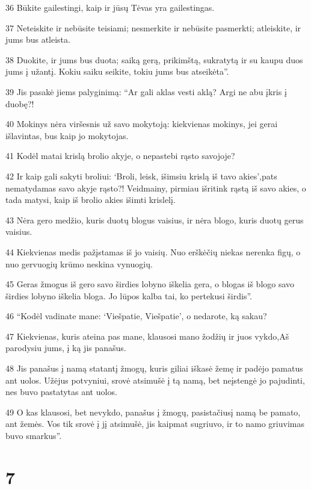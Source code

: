 \par 36 Būkite gailestingi, kaip ir jūsų Tėvas yra gailestingas. 
\par 37 Neteiskite ir nebūsite teisiami; nesmerkite ir nebūsite pasmerkti; atleiskite, ir jums bus atleista. 
\par 38 Duokite, ir jums bus duota; saiką gerą, prikimštą, sukratytą ir su kaupu duos jums į užantį. Kokiu saiku seikite, tokiu jums bus atseikėta”. 
\par 39 Jis pasakė jiems palyginimą: “Ar gali aklas vesti aklą? Argi ne abu įkris į duobę?! 
\par 40 Mokinys nėra viršesnis už savo mokytoją: kiekvienas mokinys, jei gerai išlavintas, bus kaip jo mokytojas. 
\par 41 Kodėl matai krislą brolio akyje, o nepastebi rąsto savojoje? 
\par 42 Ir kaip gali sakyti broliui: ‘Broli, leisk, išimsiu krislą iš tavo akies’,­pats nematydamas savo akyje rąsto?! Veidmainy, pirmiau išritink rąstą iš savo akies, o tada matysi, kaip iš brolio akies išimti krislelį. 
\par 43 Nėra gero medžio, kuris duotų blogus vaisius, ir nėra blogo, kuris duotų gerus vaisius. 
\par 44 Kiekvienas medis pažįstamas iš jo vaisių. Nuo erškėčių niekas nerenka figų, o nuo gervuogių krūmo neskina vynuogių. 
\par 45 Geras žmogus iš gero savo širdies lobyno iškelia gera, o blogas iš blogo savo širdies lobyno iškelia bloga. Jo lūpos kalba tai, ko pertekusi širdis”. 
\par 46 “Kodėl vadinate mane: ‘Viešpatie, Viešpatie’, o nedarote, ką sakau? 
\par 47 Kiekvienas, kuris ateina pas mane, klausosi mano žodžių ir juos vykdo,­Aš parodysiu jums, į ką jis panašus. 
\par 48 Jis panašus į namą statantį žmogų, kuris giliai iškasė žemę ir padėjo pamatus ant uolos. Užėjus potvyniui, srovė atsimušė į tą namą, bet neįstengė jo pajudinti, nes buvo pastatytas ant uolos. 
\par 49 O kas klausosi, bet nevykdo, panašus į žmogų, pasistačiusį namą be pamato, ant žemės. Vos tik srovė į jį atsimušė, jis kaipmat sugriuvo, ir to namo griuvimas buvo smarkus”.



\chapter{7}


